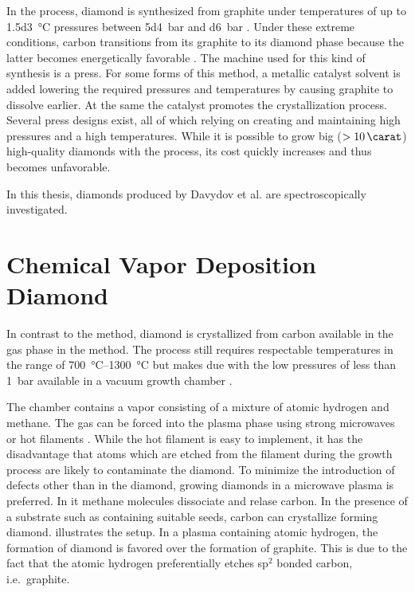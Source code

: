 	In the \HPHT process, diamond is synthesized from graphite under temperatures of up to \SI{1.5d3}{\celsius} pressures between \SI{5d4}{bar} and \SI{d6}{bar} \cite{davis1993diamond}. Under these extreme conditions, carbon transitions from its graphite to its diamond phase because the latter becomes energetically favorable \cite{liander1955artificial, bundy1955man, bovenkerk1993errors, bovenkerk1959preparation}.
	The machine used for this kind of synthesis is a press.
	For some forms of this method, a metallic catalyst solvent is added lowering the required pressures and temperatures by causing graphite to dissolve earlier. At the same the catalyst promotes the crystallization process.
	Several press designs exist, all of which relying on creating and maintaining high pressures and a high temperatures.
	While it is possible to grow big ($> \SI{10}{\carat}$) high-quality diamonds with the \HPHT process, its cost quickly increases and thus becomes unfavorable.

	In this thesis, \HPHT \nds diamonds produced by Davydov et al. \cite{Davydov2014} are spectroscopically investigated.

\section{Chemical Vapor Deposition Diamond}\label{sec::cvd}

	In contrast to the \HPHT method, diamond is crystallized from carbon available in the gas phase in the \CVD method.
	The process still requires respectable temperatures in the range of \SIrange{700}{1300}{\celsius} but makes due with the low pressures of less than \SI{1}{\bar} available in a vacuum growth chamber \cite{schwander2011review}.

	The chamber contains a vapor consisting of a mixture of atomic hydrogen and methane. The gas can be forced into the plasma phase using strong microwaves or hot filaments \cite{balmer2009chemical, ferro2002synthesis, koizumi2008physics}. While the hot filament is easy to implement, it has the disadvantage that atoms which are etched from the filament during the growth process are likely to contaminate the diamond. To minimize the introduction of defects other than \sivs in the diamond, growing diamonds in a microwave plasma is preferred. In it methane molecules dissociate and relase carbon. In the presence of a substrate such as \ir containing suitable seeds, carbon can crystallize forming diamond.  illustrates the setup. In a plasma containing atomic hydrogen, the formation of diamond is favored over the formation of graphite. This is due to the fact that the atomic hydrogen preferentially etches sp$^2$ bonded carbon, i.e.\ graphite.

